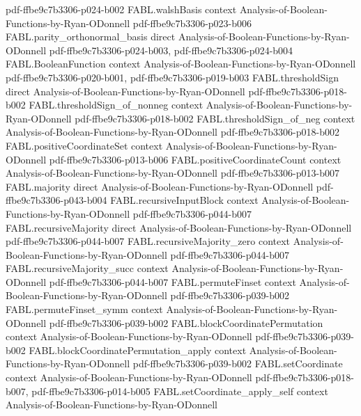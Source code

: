 \begin{theorem}
  {pdf-ffbe9c7b3306-p024-b002}
\proofstep
  {FABL.walshBasis}
  {context}
  {Analysis-of-Boolean-Functions-by-Ryan-ODonnell}
  {pdf-ffbe9c7b3306-p023-b006}
\proofstep
  {FABL.parity_orthonormal_basis}
  {direct}
  {Analysis-of-Boolean-Functions-by-Ryan-ODonnell}
  {pdf-ffbe9c7b3306-p024-b003,
    pdf-ffbe9c7b3306-p024-b004}
\proofstep
  {FABL.BooleanFunction}
  {context}
  {Analysis-of-Boolean-Functions-by-Ryan-ODonnell}
  {pdf-ffbe9c7b3306-p020-b001,
    pdf-ffbe9c7b3306-p019-b003}
\proofstep
  {FABL.thresholdSign}
  {direct}
  {Analysis-of-Boolean-Functions-by-Ryan-ODonnell}
  {pdf-ffbe9c7b3306-p018-b002}
\proofstep
  {FABL.thresholdSign_of_nonneg}
  {context}
  {Analysis-of-Boolean-Functions-by-Ryan-ODonnell}
  {pdf-ffbe9c7b3306-p018-b002}
\proofstep
  {FABL.thresholdSign_of_neg}
  {context}
  {Analysis-of-Boolean-Functions-by-Ryan-ODonnell}
  {pdf-ffbe9c7b3306-p018-b002}
\proofstep
  {FABL.positiveCoordinateSet}
  {context}
  {Analysis-of-Boolean-Functions-by-Ryan-ODonnell}
  {pdf-ffbe9c7b3306-p013-b006}
\proofstep
  {FABL.positiveCoordinateCount}
  {context}
  {Analysis-of-Boolean-Functions-by-Ryan-ODonnell}
  {pdf-ffbe9c7b3306-p013-b007}
\proofstep
  {FABL.majority}
  {direct}
  {Analysis-of-Boolean-Functions-by-Ryan-ODonnell}
  {pdf-ffbe9c7b3306-p043-b004}
\proofstep
  {FABL.recursiveInputBlock}
  {context}
  {Analysis-of-Boolean-Functions-by-Ryan-ODonnell}
  {pdf-ffbe9c7b3306-p044-b007}
\proofstep
  {FABL.recursiveMajority}
  {direct}
  {Analysis-of-Boolean-Functions-by-Ryan-ODonnell}
  {pdf-ffbe9c7b3306-p044-b007}
\proofstep
  {FABL.recursiveMajority_zero}
  {context}
  {Analysis-of-Boolean-Functions-by-Ryan-ODonnell}
  {pdf-ffbe9c7b3306-p044-b007}
\proofstep
  {FABL.recursiveMajority_succ}
  {context}
  {Analysis-of-Boolean-Functions-by-Ryan-ODonnell}
  {pdf-ffbe9c7b3306-p044-b007}
\proofstep
  {FABL.permuteFinset}
  {context}
  {Analysis-of-Boolean-Functions-by-Ryan-ODonnell}
  {pdf-ffbe9c7b3306-p039-b002}
\proofstep
  {FABL.permuteFinset_symm}
  {context}
  {Analysis-of-Boolean-Functions-by-Ryan-ODonnell}
  {pdf-ffbe9c7b3306-p039-b002}
\proofstep
  {FABL.blockCoordinatePermutation}
  {context}
  {Analysis-of-Boolean-Functions-by-Ryan-ODonnell}
  {pdf-ffbe9c7b3306-p039-b002}
\proofstep
  {FABL.blockCoordinatePermutation_apply}
  {context}
  {Analysis-of-Boolean-Functions-by-Ryan-ODonnell}
  {pdf-ffbe9c7b3306-p039-b002}
\proofstep
  {FABL.setCoordinate}
  {context}
  {Analysis-of-Boolean-Functions-by-Ryan-ODonnell}
  {pdf-ffbe9c7b3306-p018-b007,
    pdf-ffbe9c7b3306-p014-b005}
\proofstep
  {FABL.setCoordinate_apply_self}
  {context}
  {Analysis-of-Boolean-Functions-by-Ryan-ODonnell}

\end{theorem}
